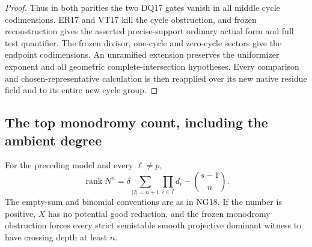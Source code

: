 \begin{proof}
Thus in both parities the two DQ17 gates vanish in all
middle cycle codimensions.  ER17 and VT17 kill the cycle
obstruction, and frozen reconstruction gives the asserted
precise-support ordinary actual form and full test quantifier.
The frozen divisor, one-cycle and zero-cycle sectors give
the endpoint codimensions.
An unramified extension preserves the uniformizer exponent
and all geometric complete-intersection hypotheses.
Every comparison and chosen-representative calculation is
then reapplied over its new native residue field and to
its entire new cycle group.
\end{proof}

\subsection{The top monodromy count, including the ambient degree}

\begin{proposition}
\label{r18ca:monodromy}
For the preceding model and every $\ell\ne p$,
\[
 \operatorname{rank}N^n
       =\delta\sum_{|I|=n+1}\prod_{i\in I}d_i
                                 -\binom{s-1}{n}.
 \tag{CA18.9}\label{r18ca:rank}
\]
The empty-sum and binomial conventions are as in NG18.
If the number is positive, $X$ has no potential good
reduction, and the frozen monodromy obstruction forces
every strict semistable smooth projective dominant witness
to have crossing depth at least $n$.
\end{proposition}

